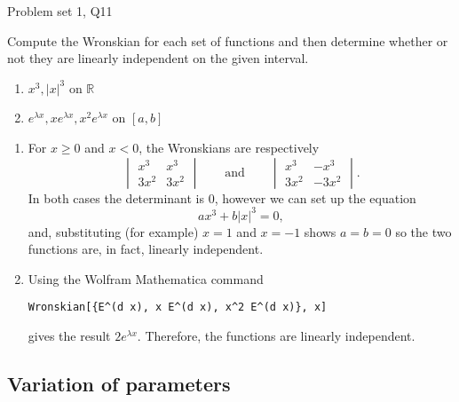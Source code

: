 \begin{problem}{Problem set 1, Q11}{}


    Compute the Wronskian for each set of functions and then determine whether or not they are linearly independent on the given interval.

    \begin{enumerate}
        \item $x^3, \lvert x \rvert^3$ on $\mathbb{R}$
        \item $e^{\lambda x}, xe^{\lambda x}, x^2 e^{\lambda x}$ on $[a, b]$
    \end{enumerate}

    \tcblower

    \begin{enumerate}
        \item {} For $x \geq 0$ and $x < 0$, the Wronskians are respectively
            $$ 
                \begin{vmatrix}
                    x^3 & x^3 \\
                    3x^2 & 3x^2
                \end{vmatrix}
                \qquad \text{and} \qquad
                \begin{vmatrix}
                    x^3 & -x^3 \\
                    3x^2 & -3x^2
                \end{vmatrix} .
            $$
        In both cases the determinant is $0$, however we can set up the equation
            $$ ax^3 + b \lvert x \rvert^3 = 0 , $$
        and, substituting (for example) $x = 1$ and $x = -1$ shows $a = b = 0$ so the two functions are, in fact, linearly independent.
        \item {} Using the Wolfram Mathematica command
            \begin{center}
                \lstinline|Wronskian[{E^(d x), x E^(d x), x^2 E^(d x)}, x]|
            \end{center}
        gives the result $2 e^{\lambda x}$. Therefore, the functions are linearly independent.
    \end{enumerate}

\end{problem}

\subsection{Variation of parameters}

